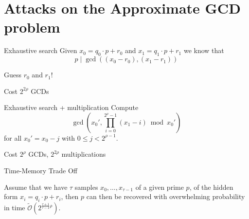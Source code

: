 \documentclass[presentation,smaller]{beamer}
\begin{document}
\section{Attacks on the Approximate GCD problem}
\label{sec:org13dc86f}

\begin{frame}[label={sec:org622d0b7}]{Exhaustive search}
Given \(x_0 = q_0 ⋅ p + r_0\) and \(x_1 = q_1 ⋅ p + r_1\) we know that \[p \mid \gcd\left((x_0 - r_0), (x_1 - r_1)\right)\]


Guess \(r_0\) and \(r_1\)!

\begin{block}{Cost}
\(2^{2ρ}\) GCDs
\end{block}
\end{frame}

\begin{frame}[label={sec:org01476e9}]{Exhaustive search + multiplication}
Compute \[\gcd\left(x_0', \prod_{i=0}^{2^ρ-1} (x_1 - i) \bmod x_0'\right)\] for all \(x_0' = x_0 - j\) with \(0 \leq j < 2^{ρ-1}\).

\begin{block}{Cost}
\(2^ρ\) GCDs, \(2^{2ρ}\) multiplications
\end{block}
\end{frame}

\begin{frame}[label={sec:org0fba55b}]{Time-Memory Trade Off}
\begin{lemma}
Assume that we have \(τ\) samples \(x_0 , … ,x_{τ-1}\) of a given prime \(p\), of the hidden form \(x_i = q_i ⋅ p + r_i\), then \(p\) can then be recovered with overwhelming probability in time \(\tilde{\mathcal{O}}(2^{\frac{τ+1}{τ-1}ρ})\). 
\end{lemma}
\end{frame}
\end{document}
